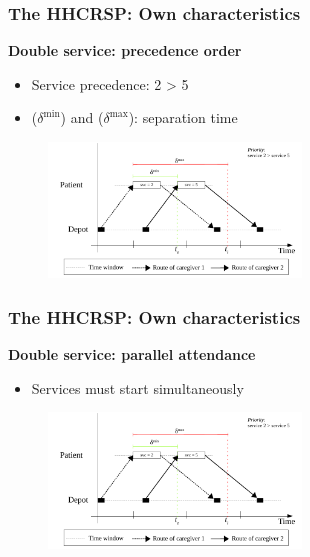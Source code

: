 %
%

\begin{frame}
   \frametitle{The HHCRSP: Own characteristics}
   \textbf{Double service: precedence order}
   \begin{itemize}
      \item Service precedence: 2 > 5
      \item ($\delta^\mathrm{min}$) and ($\delta^\mathrm{max}$): separation time
   \end{itemize}

   \begin{figure}
      \centering
      \includegraphics[width=0.6\textwidth,page=1]{fig/sync-tsn2}
   \end{figure}
\end{frame}

\begin{frame}
   \frametitle{The HHCRSP: Own characteristics}
   \textbf{Double service: parallel attendance}
   \begin{itemize}
      \item Services must start simultaneously
   \end{itemize}

   \begin{figure}
      \centering
      \includegraphics[width=0.6\textwidth,page=2]{fig/sync-tsn2}
   \end{figure}
\end{frame}

